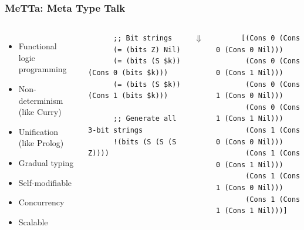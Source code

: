 \documentclass[aspectratio=169]{beamer}
\begin{document}
\begin{frame}[fragile]

  \frametitle{MeTTa: Meta Type Talk}

  \begin{columns}

    \column{7cm}
    \begin{itemize}
    \item Functional logic programming
    \item Non-determinism (like Curry)
    \item Unification (like Prolog)
    \item Gradual typing
    \item Self-modifiable
    \item Concurrency
    \item Scalable
    \end{itemize}

    \column{7cm}

    \begin{lstlisting}
      ;; Bit strings
      (= (bits Z) Nil)
      (= (bits (S $k)) (Cons 0 (bits $k)))
      (= (bits (S $k)) (Cons 1 (bits $k)))

      ;; Generate all 3-bit strings
      !(bits (S (S (S Z))))
    \end{lstlisting}

    \begin{center}
      $\Downarrow$
    \end{center}

    \begin{lstlisting}
      [(Cons 0 (Cons 0 (Cons 0 Nil)))
       (Cons 0 (Cons 0 (Cons 1 Nil)))
       (Cons 0 (Cons 1 (Cons 0 Nil)))
       (Cons 0 (Cons 1 (Cons 1 Nil)))
       (Cons 1 (Cons 0 (Cons 0 Nil)))
       (Cons 1 (Cons 0 (Cons 1 Nil)))
       (Cons 1 (Cons 1 (Cons 0 Nil)))
       (Cons 1 (Cons 1 (Cons 1 Nil)))]
    \end{lstlisting}

  \end{columns}

\end{frame}
\end{document}
